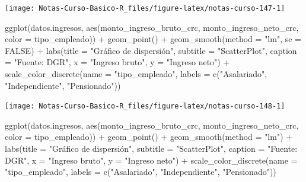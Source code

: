 \documentclass[
  12pt,
]{book}
\newenvironment{Shaded}{\begin{snugshade}}{\end{snugshade}}
\newcommand{\AttributeTok}[1]{\textcolor[rgb]{0.77,0.63,0.00}{#1}}
\newcommand{\ConstantTok}[1]{\textcolor[rgb]{0.00,0.00,0.00}{#1}}
\newcommand{\FunctionTok}[1]{\textcolor[rgb]{0.00,0.00,0.00}{#1}}
\newcommand{\NormalTok}[1]{#1}
\newcommand{\SpecialCharTok}[1]{\textcolor[rgb]{0.00,0.00,0.00}{#1}}
\newcommand{\StringTok}[1]{\textcolor[rgb]{0.31,0.60,0.02}{#1}}
\begin{document}
\begin{center}\texttt{[image: Notas-Curso-Basico-R\_files/figure-latex/notas-curso-147-1]} \end{center}

\begin{Shaded}
\begin{Highlighting}[]
\FunctionTok{ggplot}\NormalTok{(datos.ingresos, }\FunctionTok{aes}\NormalTok{(monto\_ingreso\_bruto\_crc, monto\_ingreso\_neto\_crc, }\AttributeTok{color =}\NormalTok{ tipo\_empleado)) }\SpecialCharTok{+}
  \FunctionTok{geom\_point}\NormalTok{() }\SpecialCharTok{+}
  \FunctionTok{geom\_smooth}\NormalTok{(}\AttributeTok{method =} \StringTok{"lm"}\NormalTok{, }\AttributeTok{se =} \ConstantTok{FALSE}\NormalTok{) }\SpecialCharTok{+}
  \FunctionTok{labs}\NormalTok{(}\AttributeTok{title =} \StringTok{"Gráfico de dispersión"}\NormalTok{,}
    \AttributeTok{subtitle =} \StringTok{"ScatterPlot"}\NormalTok{,}
    \AttributeTok{caption =} \StringTok{"Fuente: DGR"}\NormalTok{,}
    \AttributeTok{x =} \StringTok{"Ingreso bruto"}\NormalTok{,}
    \AttributeTok{y =} \StringTok{"Ingreso neto"}\NormalTok{) }\SpecialCharTok{+}
  \FunctionTok{scale\_color\_discrete}\NormalTok{(}\AttributeTok{name =} \StringTok{"tipo\_empleado"}\NormalTok{, }\AttributeTok{labels =} \FunctionTok{c}\NormalTok{(}\StringTok{"Asalariado"}\NormalTok{, }\StringTok{"Independiente"}\NormalTok{, }\StringTok{"Pensionado"}\NormalTok{))}
\end{Highlighting}
\end{Shaded}

\begin{center}\texttt{[image: Notas-Curso-Basico-R\_files/figure-latex/notas-curso-148-1]} \end{center}

\begin{Shaded}
\begin{Highlighting}[]
\FunctionTok{ggplot}\NormalTok{(datos.ingresos, }\FunctionTok{aes}\NormalTok{(monto\_ingreso\_bruto\_crc, monto\_ingreso\_neto\_crc, }\AttributeTok{color =}\NormalTok{ tipo\_empleado)) }\SpecialCharTok{+}
  \FunctionTok{geom\_point}\NormalTok{() }\SpecialCharTok{+}
  \FunctionTok{geom\_smooth}\NormalTok{(}\AttributeTok{method =} \StringTok{"lm"}\NormalTok{) }\SpecialCharTok{+}
  \FunctionTok{labs}\NormalTok{(}\AttributeTok{title =} \StringTok{"Gráfico de dispersión"}\NormalTok{,}
    \AttributeTok{subtitle =} \StringTok{"ScatterPlot"}\NormalTok{,}
    \AttributeTok{caption =} \StringTok{"Fuente: DGR"}\NormalTok{,}
    \AttributeTok{x =} \StringTok{"Ingreso bruto"}\NormalTok{,}
    \AttributeTok{y =} \StringTok{"Ingreso neto"}\NormalTok{) }\SpecialCharTok{+}
  \FunctionTok{scale\_color\_discrete}\NormalTok{(}\AttributeTok{name =} \StringTok{"tipo\_empleado"}\NormalTok{, }\AttributeTok{labels =} \FunctionTok{c}\NormalTok{(}\StringTok{"Asalariado"}\NormalTok{, }\StringTok{"Independiente"}\NormalTok{, }\StringTok{"Pensionado"}\NormalTok{))}
\end{Highlighting}
\end{Shaded}
\end{document}
